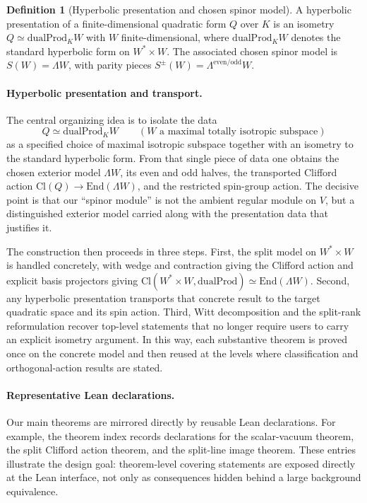 \documentclass{birkjour}
\theoremstyle{plain}
\theoremstyle{definition}
\newtheorem{definition}[theorem]{Definition}
\theoremstyle{remark}
\newcommand{\Cl}{\mathrm{Cl}}
\newcommand{\End}{\mathrm{End}}
\newcommand{\dualProd}{\mathrm{dualProd}}
\newcommand{\wedgeW}{\Lambda W}
\begin{document}
\begin{definition}[Hyperbolic presentation and chosen spinor model]
A hyperbolic presentation of a finite-dimensional quadratic form $Q$ over $K$
is an isometry $Q \simeq \dualProd_K W$ with $W$ finite-dimensional, where
$\dualProd_K W$ denotes the standard hyperbolic form on $W^* \times W$. The
associated chosen spinor model is $S(W)=\wedgeW$, with parity pieces
$S^\pm(W)=\Lambda^{\mathrm{even}/\mathrm{odd}} W$.
\end{definition}

\paragraph{Hyperbolic presentation and transport.} The central organizing idea is
to isolate the data
\[
  Q \simeq \dualProd_K W
  \qquad (W \text{ a maximal totally isotropic subspace})
\]
as a specified choice of maximal isotropic subspace together with an isometry to
the standard hyperbolic form. From that single piece of data one obtains the
chosen exterior model $\wedgeW$, its even and odd halves, the transported
Clifford action $\Cl(Q)\to\End(\wedgeW)$, and the restricted spin-group
action. The decisive point is that our ``spinor module'' is not the
ambient regular module on $V$, but a distinguished exterior model carried along
with the presentation data that justifies it.

The construction then proceeds in three steps. First, the split model on
$W^* \times W$ is handled concretely, with wedge and contraction giving the
Clifford action and explicit basis projectors giving
$\Cl(W^* \times W,\dualProd)\simeq\End(\wedgeW)$. Second, any hyperbolic
presentation transports that concrete result to the target quadratic space and
its spin action. Third, Witt decomposition and the split-rank reformulation recover
top-level statements that no longer require users to carry an explicit isometry
argument. In this way, each substantive theorem is proved once on the concrete
model and then reused at the levels where classification and orthogonal-action
results are stated.

\paragraph{Representative Lean declarations.}
Our main theorems are mirrored directly by reusable Lean declarations.
For example, the theorem index records declarations for the scalar-vacuum
theorem, the split Clifford action theorem, and the split-line image theorem.
These entries illustrate the design goal: theorem-level covering statements are
exposed directly at the Lean interface, not only as consequences hidden behind a
large background equivalence.
\end{document}
